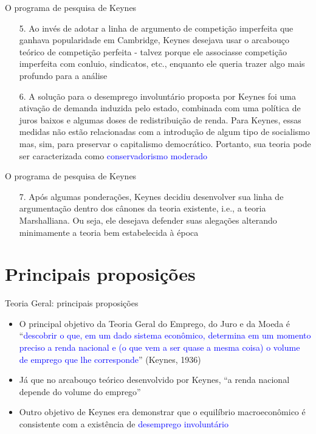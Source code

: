 \documentclass[10pt]{beamer}
\begin{document}
\begin{frame}{O programa de pesquisa de Keynes}
    \begin{enumerate}        
        \item[5.] Ao invés de adotar a linha de argumento de competição imperfeita que ganhava popularidade em Cambridge, Keynes desejava usar o arcabouço teórico de competição perfeita - talvez porque ele associasse competição imperfeita com conluio, sindicatos, etc., enquanto ele queria trazer algo mais profundo para a análise\bigskip
        \item[6.] A solução para o desemprego involuntário proposta por Keynes foi uma ativação de demanda induzida pelo estado, combinada com uma política de juros baixos e algumas doses de redistribuição de renda. Para Keynes, essas medidas não estão relacionadas com a introdução de algum tipo de socialismo mas, sim, para preservar o capitalismo democrático. Portanto, sua teoria pode ser caracterizada como \textcolor{blue}{conservadorismo moderado}
    \end{enumerate}
\end{frame}

\begin{frame}{O programa de pesquisa de Keynes}
    \begin{enumerate}        
        \item[7.] Após algumas ponderações, Keynes decidiu desenvolver sua linha de argumentação dentro dos cânones da teoria existente, i.e., a teoria Marshalliana. Ou seja, ele desejava defender suas alegações alterando minimamente a teoria bem estabelecida à época
    \end{enumerate}
\end{frame}

\section{Principais proposições}
\begin{frame}{Teoria Geral: principais proposições}
    \begin{itemize}
        \item O principal objetivo da Teoria Geral do Emprego, do Juro e da Moeda é ``\textcolor{blue}{descobrir o que, em um dado sistema econômico, determina em um momento preciso a renda nacional e  (o que vem a ser quase a mesma coisa) o volume de emprego que lhe corresponde}'' (Keynes, 1936)
        \bigskip
        \item Já que no arcabouço teórico desenvolvido por Keynes, ``a renda nacional depende do volume do emprego''
        \bigskip
        \item Outro objetivo de Keynes era demonstrar que o equilíbrio macroeconômico é consistente com a existência de \textcolor{blue}{desemprego involuntário}
    \end{itemize}
\end{frame}
\end{document}
